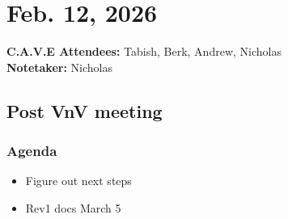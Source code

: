	\pagebreak
	\section*{Feb. 12, 2026}

	\textbf{C.A.V.E Attendees:} Tabish, Berk, Andrew, Nicholas\\
	\textbf{Notetaker:} Nicholas

	\subsection*{Post VnV meeting}
		\subsubsection*{Agenda}
			\begin{itemize}
				\item Figure out next steps
				\item Rev1 docs March 5
			\end{itemize}


